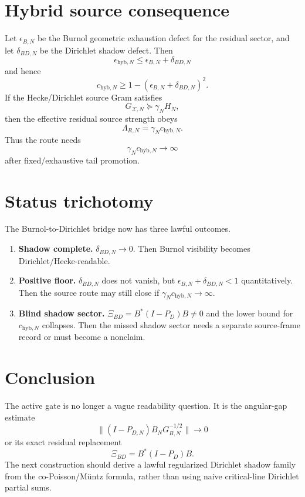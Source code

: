 \documentclass[11pt]{article}
\begin{document}
\section{Hybrid source consequence}
Let $\epsilon_{B,N}$ be the Burnol geometric exhaustion defect for the residual sector, and let $\delta_{BD,N}$ be the Dirichlet shadow defect.  Then
\[
\epsilon_{\mathrm{hyb},N}\le \epsilon_{B,N}+\delta_{BD,N}
\]
and hence
\[
c_{\mathrm{hyb},N}\ge 1-(\epsilon_{B,N}+\delta_{BD,N})^2.
\]
If the Hecke/Dirichlet source Gram satisfies
\[
G_{\mathcal X,N}\succeq \gamma_NH_N,
\]
then the effective residual source strength obeys
\[
\Lambda_{R,N}=\gamma_Nc_{\mathrm{hyb},N}.
\]
Thus the route needs
\[
\gamma_Nc_{\mathrm{hyb},N}\to\infty
\]
after fixed/exhaustive tail promotion.

\section{Status trichotomy}
The Burnol-to-Dirichlet bridge now has three lawful outcomes.

\begin{enumerate}[label=(\alph*)]
\item \textbf{Shadow complete.}  $\delta_{BD,N}\to0$.  Then Burnol visibility becomes Dirichlet/Hecke-readable.
\item \textbf{Positive floor.}  $\delta_{BD,N}$ does not vanish, but $\epsilon_{B,N}+\delta_{BD,N}<1$ quantitatively.  Then the source route may still close if $\gamma_Nc_{\mathrm{hyb},N}\to\infty$.
\item \textbf{Blind shadow sector.}  $\Xi_{BD}=B^*(I-P_D)B\ne0$ and the lower bound for $c_{\mathrm{hyb},N}$ collapses.  Then the missed shadow sector needs a separate source-frame record or must become a nonclaim.
\end{enumerate}

\section{Conclusion}
The active gate is no longer a vague readability question.  It is the angular-gap estimate
\[
\|(I-P_{D,N})B_NG_{B,N}^{-1/2}\|\to0
\]
or its exact residual replacement
\[
\Xi_{BD}=B^*(I-P_D)B.
\]
The next construction should derive a lawful regularized Dirichlet shadow family from the co-Poisson/Müntz formula, rather than using naive critical-line Dirichlet partial sums.
\end{document}
